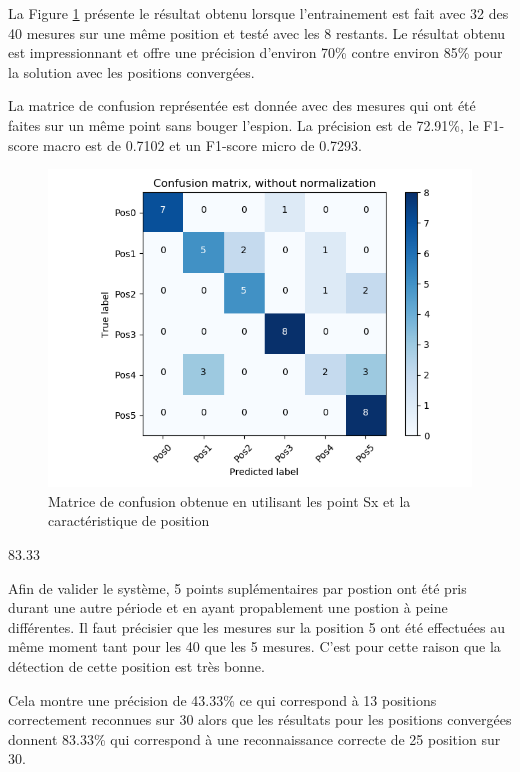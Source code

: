 La Figure \ref{fig:matPosSxTPos} présente le résultat obtenu lorsque l'entrainement est fait avec 32 des 40 mesures sur une même position et testé avec les 8 restants. Le résultat obtenu est impressionnant et offre une précision d'environ 70\% contre environ 85\% pour la solution avec les positions convergées. 

La matrice de confusion représentée est donnée avec des mesures qui ont été faites sur un même point sans bouger l'espion. La précision est de 72.91\%, le F1-score macro est de 0.7102 et un F1-score micro de 0.7293.  
\begin{figure}[htp]
	\begin{center}
		\includegraphics[scale=0.5]{figures/mat_pos_Sx_pos.png}
		\caption{Matrice de confusion obtenue en utilisant les point Sx et la caractéristique de position}
		\label{fig:matPosSxTPos} %
	\end{center}
\end{figure}
83.33%

Afin de valider le système, 5 points suplémentaires par postion ont été pris durant une autre période et en ayant propablement une postion à peine différentes. Il faut précisier que les mesures sur la position 5 ont été effectuées au même moment tant pour les 40 que les 5 mesures. C'est pour cette raison que la détection de cette position est très bonne. 

Cela montre une précision de 43.33\% ce qui correspond à 13 positions correctement reconnues sur 30 alors que les résultats pour les positions convergées donnent 83.33\% qui correspond à une reconnaissance correcte de 25 position sur 30.

